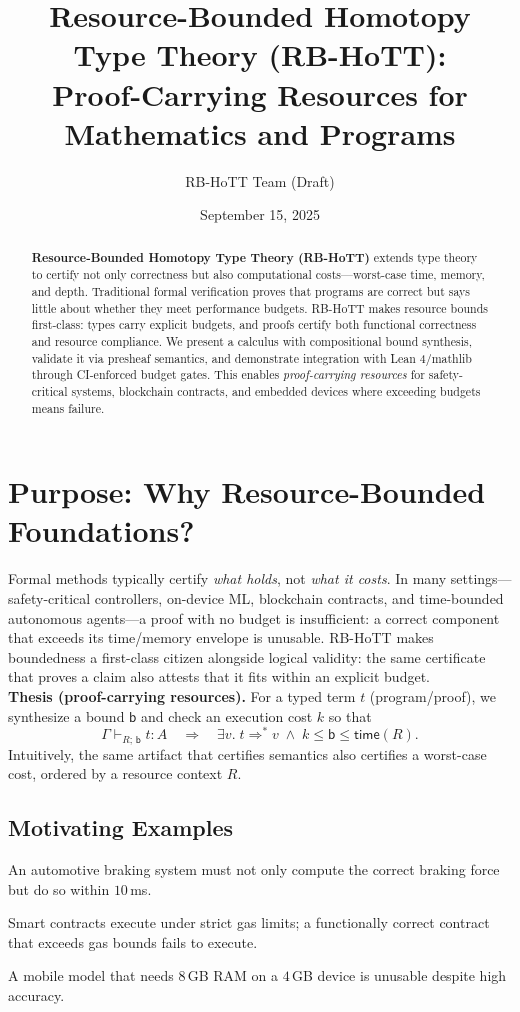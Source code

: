 \documentclass[11pt]{article}
\title{Resource-Bounded Homotopy Type Theory (RB-HoTT):\\Proof-Carrying Resources for Mathematics and Programs}
\author{RB-HoTT Team (Draft)}
\date{September 15, 2025}
\newcommand{\Time}{\mathsf{time}}
\newcommand{\seq}{\Rightarrow^{*}}
\newcommand{\bb}{\mathsf{b}}
\newcommand{\ctx}{\Gamma}
\begin{document}
\maketitle

\begin{abstract}
\textbf{Resource-Bounded Homotopy Type Theory (RB-HoTT)} extends type theory to certify not only correctness but also computational costs—worst-case time, memory, and depth. Traditional formal verification proves that programs are correct but says little about whether they meet performance budgets. RB-HoTT makes resource bounds first-class: types carry explicit budgets, and proofs certify both functional correctness and resource compliance. We present a calculus with compositional bound synthesis, validate it via presheaf semantics, and demonstrate integration with Lean 4/mathlib through CI-enforced budget gates. This enables \emph{proof-carrying resources} for safety-critical systems, blockchain contracts, and embedded devices where exceeding budgets means failure.
\end{abstract}

\section{Purpose: Why Resource-Bounded Foundations?}
Formal methods typically certify \emph{what holds}, not \emph{what it costs}. In many settings—safety-critical controllers, on-device ML, blockchain contracts, and time-bounded autonomous agents—a proof with no budget is insufficient: a correct component that exceeds its time/memory envelope is unusable. RB-HoTT makes boundedness a first-class citizen alongside logical validity: the same certificate that proves a claim also attests that it fits within an explicit budget.\\
\textbf{Thesis (proof-carrying resources).} For a typed term $t$ (program/proof), we synthesize a bound $\bb$ and check an execution cost $k$ so that
\[
\ctx \vdash_{R;\,\bb} t : A \quad\Longrightarrow\quad \exists v.\; t \seq v\;\wedge\; k\le \bb \le \Time(R).
\]
Intuitively, the same artifact that certifies semantics also certifies a worst-case cost, ordered by a resource context $R$.

\subsection{Motivating Examples}
\begin{description}[leftmargin=2em,labelsep=0.5em]
  \item[Safety-critical real-time:] An automotive braking system must not only compute the correct braking force but do so within $10$\,ms.
  \item[Blockchain gas:] Smart contracts execute under strict gas limits; a functionally correct contract that exceeds gas bounds fails to execute.
  \item[Edge/embedded ML:] A mobile model that needs $8$\,GB RAM on a $4$\,GB device is unusable despite high accuracy.
\end{description}
\end{document}
